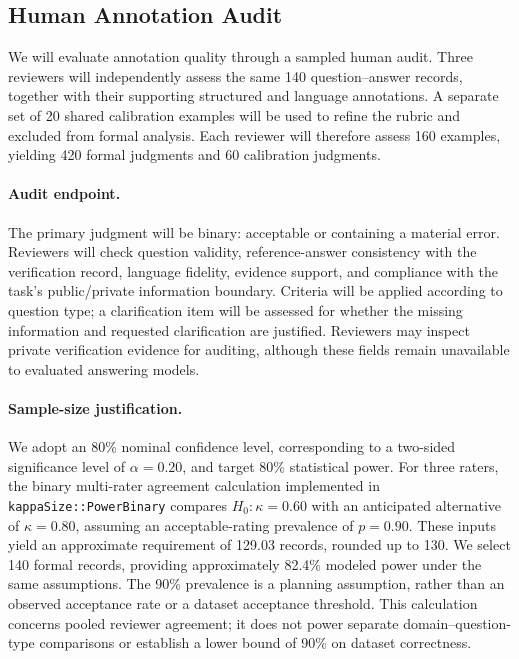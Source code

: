 \subsection{Human Annotation Audit}
\label{sec:human-annotation-audit}

We will evaluate annotation quality through a sampled human audit. Three
reviewers will independently assess the same 140 question--answer records,
together with their supporting structured and language annotations. A separate
set of 20 shared calibration examples will be used to refine the rubric and
excluded from formal analysis. Each reviewer will therefore assess 160
examples, yielding 420 formal judgments and 60 calibration judgments.

\paragraph{Audit endpoint.}
The primary judgment will be binary: acceptable or containing a material
error. Reviewers will check question validity, reference-answer consistency
with the verification record, language fidelity, evidence support, and
compliance with the task's public/private information boundary. Criteria will
be applied according to question type; a clarification item will be assessed
for whether the missing information and requested clarification are justified.
Reviewers may inspect private verification evidence for auditing, although
these fields remain unavailable to evaluated answering models.

\paragraph{Sample-size justification.}
We adopt an 80\% nominal confidence level, corresponding to a two-sided
significance level of $\alpha=0.20$, and target 80\% statistical power.
For three raters, the binary multi-rater agreement calculation implemented
in \texttt{kappaSize::PowerBinary} \citep{rotondiKappaSize} compares
$H_0:\kappa=0.60$ with an anticipated alternative of $\kappa=0.80$,
assuming an acceptable-rating prevalence of $p=0.90$.
These inputs yield an approximate requirement of 129.03 records, rounded up
to 130. We select 140 formal records, providing approximately 82.4\% modeled
power under the same assumptions. The 90\% prevalence is a planning
assumption, rather than an observed acceptance rate or a dataset acceptance
threshold. This calculation concerns pooled reviewer agreement; it does not
power separate domain--question-type comparisons or establish a lower bound
of 90\% on dataset correctness.


